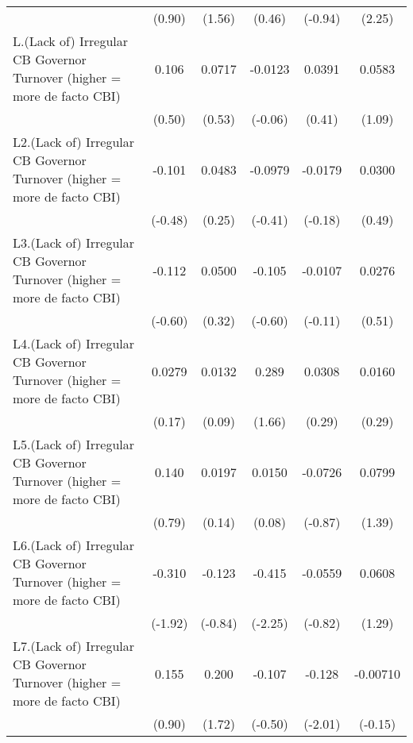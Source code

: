 {\begin{longtable}{l*{5}{c}}
                &   (0.90)         &   (1.56)         &   (0.46)         &  (-0.94)         &   (2.25)         \\
[1em]
L.(Lack of) Irregular CB Governor Turnover (higher = more de facto CBI)&    0.106         &   0.0717         &  -0.0123         &   0.0391         &   0.0583         \\
                &   (0.50)         &   (0.53)         &  (-0.06)         &   (0.41)         &   (1.09)         \\
[1em]
L2.(Lack of) Irregular CB Governor Turnover (higher = more de facto CBI)&   -0.101         &   0.0483         &  -0.0979         &  -0.0179         &   0.0300         \\
                &  (-0.48)         &   (0.25)         &  (-0.41)         &  (-0.18)         &   (0.49)         \\
[1em]
L3.(Lack of) Irregular CB Governor Turnover (higher = more de facto CBI)&   -0.112         &   0.0500         &   -0.105         &  -0.0107         &   0.0276         \\
                &  (-0.60)         &   (0.32)         &  (-0.60)         &  (-0.11)         &   (0.51)         \\
[1em]
L4.(Lack of) Irregular CB Governor Turnover (higher = more de facto CBI)&   0.0279         &   0.0132         &    0.289         &   0.0308         &   0.0160         \\
                &   (0.17)         &   (0.09)         &   (1.66)         &   (0.29)         &   (0.29)         \\
[1em]
L5.(Lack of) Irregular CB Governor Turnover (higher = more de facto CBI)&    0.140         &   0.0197         &   0.0150         &  -0.0726         &   0.0799         \\
                &   (0.79)         &   (0.14)         &   (0.08)         &  (-0.87)         &   (1.39)         \\
[1em]
L6.(Lack of) Irregular CB Governor Turnover (higher = more de facto CBI)&   -0.310         &   -0.123         &   -0.415\sym{*}  &  -0.0559         &   0.0608         \\
                &  (-1.92)         &  (-0.84)         &  (-2.25)         &  (-0.82)         &   (1.29)         \\
[1em]
L7.(Lack of) Irregular CB Governor Turnover (higher = more de facto CBI)&    0.155         &    0.200         &   -0.107         &   -0.128\sym{*}  & -0.00710         \\
                &   (0.90)         &   (1.72)         &  (-0.50)         &  (-2.01)         &  (-0.15)         \\

\end{longtable}}
